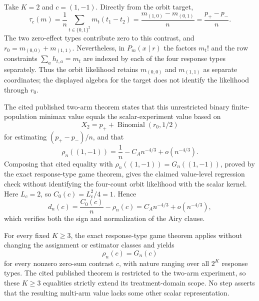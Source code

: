 Take \(K=2\) and \(c=(1,-1)\).  Directly from the orbit target,
\[
 \tau_c(m)=\frac1n\sum_{t\in\{0,1\}^2}m_t(t_1-t_2)
 =\frac{m_{(1,0)}-m_{(0,1)}}n
 =\frac{p_+-p_-}{n}.
\]
The two zero-effect types contribute zero to this contrast, and
\(r_0=m_{(0,0)}+m_{(1,1)}\).  Nevertheless, in \(P_m(x\mid r)\) the factors \(m_t!\) and the row constraints \(\sum_a h_{t,a}=m_t\) are indexed by each of the four response types separately.  Thus the orbit likelihood retains \(m_{(0,0)}\) and \(m_{(1,1)}\) as separate coordinates; the displayed algebra for the target does not identify the likelihood through \(r_0\).

The cited published two-arm theorem states that this unrestricted binary finite-population minimax value equals the scalar-experiment value based on
\[
 X_2=p_++\operatorname{Binomial}(r_0,1/2)
\]
for estimating \((p_+-p_-)/n\), and that
\[
 \rho_n((1,-1))=\frac1n-C_A n^{-4/3}+o(n^{-4/3}).
\]
Composing that cited equality with \(\rho_n((1,-1))=G_n((1,-1))\), proved by the exact response-type game theorem, gives the claimed value-level regression check without identifying the four-count orbit likelihood with the scalar kernel.  Here \(L_c=2\), so \(C_0(c)=L_c^2/4=1\).  Hence
\[
 d_n(c)=\frac{C_0(c)}n-\rho_n(c)
 =C_A n^{-4/3}+o(n^{-4/3}),
\]
which verifies both the sign and normalization of the Airy clause.

For every fixed \(K\ge3\), the exact response-type game theorem applies without changing the assignment or estimator classes and yields
\[
 \rho_n(c)=G_n(c)
\]
for every nonzero zero-sum contrast \(c\), with nature ranging over all \(2^K\) response types.  The cited published theorem is restricted to the two-arm experiment, so these \(K\ge3\) equalities strictly extend its treatment-domain scope.  No step asserts that the resulting multi-arm value lacks some other scalar representation.